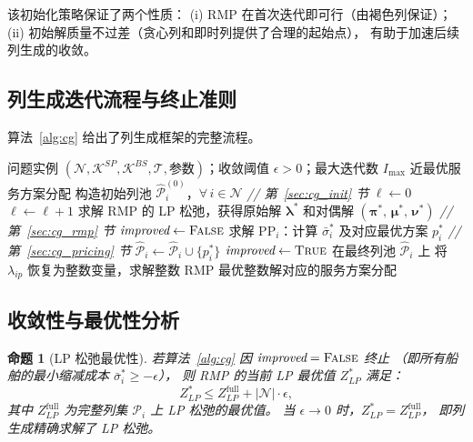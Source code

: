 \documentclass[UTF8, a4paper, 12pt]{ctexart}
\newtheorem{proposition}{命题}
\begin{document}
\noindent
该初始化策略保证了两个性质：
(i) RMP 在首次迭代即可行（由褐色列保证）；
(ii) 初始解质量不过差（贪心列和即时列提供了合理的起始点），
有助于加速后续列生成的收敛。

\subsection{列生成迭代流程与终止准则}
\label{sec:cg_algorithm}

算法~\ref{alg:cg} 给出了列生成框架的完整流程。

\begin{algorithm}[htbp]
\caption{列生成求解框架}
\label{alg:cg}
\begin{algorithmic}[1]
\REQUIRE 问题实例 $(\mathcal{N}, \mathcal{K}^{SP}, \mathcal{K}^{BS}, \mathcal{T},
  \text{参数})$；收敛阈值 $\epsilon > 0$；最大迭代数 $I_{\max}$
\ENSURE 近最优服务方案分配
\STATE 构造初始列池 $\hat{\mathcal{P}}_i^{(0)}$，$\forall\, i \in \mathcal{N}$
  \hfill \textit{// 第~\ref{sec:cg_init} 节}
\STATE $\ell \leftarrow 0$
\REPEAT
  \STATE $\ell \leftarrow \ell + 1$
  \STATE 求解 RMP 的 LP 松弛，获得原始解 $\boldsymbol{\lambda}^*$
    和对偶解 $(\boldsymbol{\pi}^*,\, \boldsymbol{\mu}^*,\, \boldsymbol{\nu}^*)$
    \hfill \textit{// 第~\ref{sec:cg_rmp} 节}
  \STATE $\textit{improved} \leftarrow \textsc{False}$
    \STATE 求解 $\text{PP}_i$：计算 $\bar{\sigma}_i^*$
      及对应最优方案 $p_i^*$
      \hfill \textit{// 第~\ref{sec:cg_pricing} 节}
      \STATE $\hat{\mathcal{P}}_i \leftarrow \hat{\mathcal{P}}_i \cup \{p_i^*\}$
      \STATE $\textit{improved} \leftarrow \textsc{True}$
    \ENDIF
  \ENDFOR
{}
\STATE 在最终列池 $\hat{\mathcal{P}}_i$ 上
  将 $\lambda_{ip}$ 恢复为整数变量，求解整数 RMP
\RETURN 最优整数解对应的服务方案分配
\end{algorithmic}
\end{algorithm}

\subsection{收敛性与最优性分析}
\label{sec:cg_convergence}

\begin{proposition}[LP 松弛最优性]
\label{prop:lp}
若算法~\ref{alg:cg} 因 $\textit{improved} = \textsc{False}$ 终止
（即所有船舶的最小缩减成本 $\bar{\sigma}_i^* \ge -\epsilon$），
则 RMP 的当前 LP 最优值 $Z_{LP}^*$ 满足：
\begin{equation}
  Z_{LP}^* \le Z_{LP}^{\text{full}} + |\mathcal{N}| \cdot \epsilon,
  \label{eq:lp_bound}
\end{equation}
其中 $Z_{LP}^{\text{full}}$ 为完整列集 $\mathcal{P}_i$ 上 LP 松弛的最优值。
当 $\epsilon \to 0$ 时，$Z_{LP}^* = Z_{LP}^{\text{full}}$，
即列生成精确求解了 LP 松弛。
\end{proposition}
\end{document}
